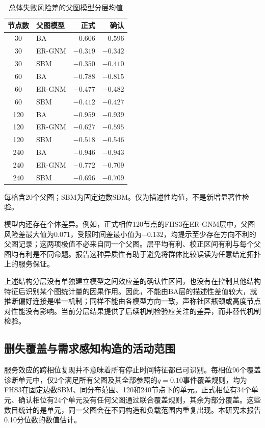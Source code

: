 \documentclass[UTF8,a4paper,twocolumn,fontset=none,zihao=5]{ctexart}
\begin{document}
\begin{table}[t]\centering
\caption{总体失败风险差的父图模型分层均值}\label{tab:2}
\small\begin{tabular*}{\columnwidth}{@{\extracolsep{\fill}}clrr}\toprule
节点数 & 父图模型 & 正式 & 确认\\\midrule
30 & BA & $-0.606$ & $-0.596$\\
30 & ER-GNM & $-0.319$ & $-0.342$\\
30 & SBM & $-0.350$ & $-0.410$\\
60 & BA & $-0.788$ & $-0.815$\\
60 & ER-GNM & $-0.477$ & $-0.482$\\
60 & SBM & $-0.412$ & $-0.427$\\
120 & BA & $-0.959$ & $-0.939$\\
120 & ER-GNM & $-0.627$ & $-0.595$\\
120 & SBM & $-0.518$ & $-0.546$\\
240 & BA & $-0.946$ & $-0.943$\\
240 & ER-GNM & $-0.772$ & $-0.709$\\
240 & SBM & $-0.696$ & $-0.709$\\
\bottomrule\end{tabular*}
\par\smallskip\footnotesize 每格含20个父图；SBM为固定边数SBM。仅为描述性均值，不是新增显著性检验。
\end{table}

模型内还存在个体差异。例如，正式相位120节点的FHS3在ER-GNM层中，父图风险差最大值为0.071，受限时间差最小值为$-$0.132，均提示至少存在方向不利的父图记录；这两项极值不必来自同一个父图。层平均有利、校正区间有利与每个父图均有利是不同命题。报告这种异质性有助于避免将群体比较误读为任意给定拓扑上的服务保证。


上述结构分层没有单独建立模型之间效应差的确认性区间，也没有在控制其他结构特征后识别某个图统计量的因果作用。因此，不能由BA层的描述性差值较大，就推断偏好连接是唯一机制；同样不能由各模型方向一致，声称社区瓶颈或高度节点对性能没有影响。当前分层结果提供了后续机制检验应关注的差异，而非替代机制检验。


\subsection{删失覆盖与需求感知构造的活动范围}

服务效应的跨相位复现并不意味着所有停止时间特征都已可识别。每相位96个覆盖诊断单元中，仅2个满足所有父图及其全部参照的$q=0.10$事件覆盖规则，均为FHS3在固定边数SBM、同分布范围、120和240节点下的单元。正式相位有34个单元、确认相位有24个单元没有任何父图通过联合覆盖规则，其余为部分覆盖。这些数目统计的是单元，同一父图会在不同构造和负载范围内重复出现。本研究未报告0.10分位数的数值估计。
\end{document}
